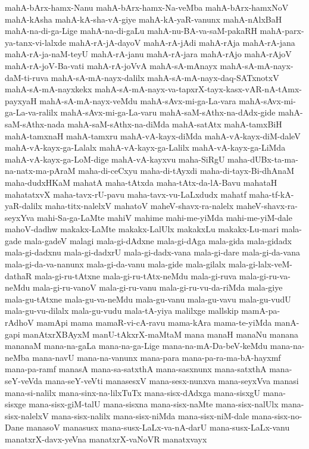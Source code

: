 {mahA-bArx-hamx-Nanu
mahA-bArx-hamx-Na-veMba
mahA-bArx-hamxNoV
mahA-kAsha
mahA-kA-sha-vA-giye
mahA-kA-yaR-vanunx
mahA-nAlxBaH
mahA-na-di-ga-Lige
mahA-na-di-gaLu
mahA-nu-BA-va-saM-pakaRH
mahA-parx-ya-tanx-vi-lalxde
mahA-rA-jA-dayoV
mahA-rA-jAdi
mahA-rAja
mahA-rA-jana
mahA-rA-ja-naM-teyU
mahA-rA-janu
mahA-rA-jara
mahA-rAjo
mahA-rAjoV
mahA-rA-joV-Ba-vati
mahA-rA-joVvA
mahA-sA-mAnayx
mahA-sA-mA-nayx-daM-ti-ruva
mahA-sA-mA-nayx-dalilx
mahA-sA-mA-nayx-daq-SATxnotxV
mahA-sA-mA-nayxkekx
mahA-sA-mA-nayx-va-tapxrX-tayx-kasx-vAR-nA-tAmx-payxyaH
mahA-sA-mA-nayx-veMdu
mahA-sAvx-mi-ga-La-vara
mahA-sAvx-mi-ga-La-va-ralilx
mahA-sAvx-mi-ga-La-varu
mahA-saM-sAthx-na-dAdx-gide
mahA-saM-sAthx-nada
mahA-saM-sAthx-na-diMda
mahA-satAtx
mahA-tamxBiH
mahA-tamxnaH
mahA-tamxru
mahA-vA-kayx-diMda
mahA-vA-kayx-diM-daleV
mahA-vA-kayx-ga-Lalalx
mahA-vA-kayx-ga-Lalilx
mahA-vA-kayx-ga-LiMda
mahA-vA-kayx-ga-LoM-dige
mahA-vA-kayxvu
maha-SiRgU
maha-dUBx-ta-ma-na-natx-ma-pAraM
maha-di-ceCxyu
maha-di-tAyxdi
maha-di-tayx-Bi-dhAnaM
maha-dudxHKaM
mahatA
maha-tAtxda
maha-tAtx-da-lA-Bavu
mahataH
mahatatxvX
maha-tavx-rU-pavu
maha-tavx-vu-LaLxdudx
mahatf
maha-tf-kA-yaR-dalilx
maha-titx-nalelxV
mahatoV
maheV-shavx-ra-nalelx
maheV-shavx-ra-seyxYva
mahi-Sa-ga-LaMte
mahiV
mahime
mahi-me-yiMda
mahi-me-yiM-dale
mahoV-dadhw
makakx-LaMte
makakx-LalUlx
makakxLu
makakx-Lu-mari
mala-gade
mala-gadeV
malagi
mala-gi-dAdxne
mala-gi-dAga
mala-gida
mala-gidadx
mala-gi-dadxnu
mala-gi-dadxrU
mala-gi-dadx-vana
mala-gi-dare
mala-gi-da-vana
mala-gi-da-va-nanunx
mala-gi-da-vanu
mala-gide
mala-gilalx
mala-gi-lalx-veM-dathaR
mala-gi-ru-tAtxne
mala-gi-ru-tAtx-neMdu
mala-gi-ruva
mala-gi-ru-va-neMdu
mala-gi-ru-vanoV
mala-gi-ru-vanu
mala-gi-ru-vu-da-riMda
mala-giye
mala-gu-tAtxne
mala-gu-va-neMdu
mala-gu-vanu
mala-gu-vavu
mala-gu-vudU
mala-gu-vu-dilalx
mala-gu-vudu
mala-tA-yiya
malilxge
mallskip
mamA-pa-rAdhoV
mamApi
mama
mamaR-vi-cA-ravu
mama-kAra
mama-te-yiMda
manA-gapi
manAtxrXBAyxM
manU-tAkxrX-maMtaM
mana
manaH
manaNu
manana
mananaM
mana-na-gaLa
mana-na-ga-Lige
mana-na-mA-Da-beV-keMdu
mana-na-neMba
mana-navU
mana-na-vanunx
mana-para
mana-pa-ra-ma-bA-hayxmf
mana-pa-ramf
manasA
mana-sa-satxthA
mana-sasxnunx
mana-satxthA
mana-seY-veVda
mana-seY-veVti
manasesxV
mana-sesx-nunxva
mana-seyxVva
manasi
mana-si-nalilx
mana-sinx-na-lilxTuTx
mana-sisx-dAdxga
mana-sisxgU
mana-sisxge
mana-sisx-giM-talU
mana-sisxna
mana-sisx-naMte
mana-sisx-nalUlx
mana-sisx-nalelxV
mana-sisx-nalilx
mana-sisx-niMda
mana-sisx-niM-dale
mana-sisx-no-Dane
manasoV
manasusx
mana-susx-LaLx-va-nA-darU
mana-susx-LaLx-vanu
manatxrX-davx-yeVna
manatxrX-vaNoVR
manatxvayx
}
